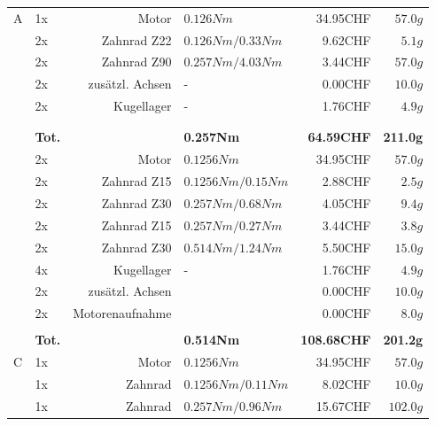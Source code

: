 \begin{figure}[h!]
\begin{tabular}{p{0.5cm}p{0.8cm}rp{3cm}rr}
    \multirow{9}[2]{*}{A}
          & 1x    & Motor           & $0.126 Nm$           & 34.95CHF & $57.0 g$ \\
          & 2x    & Zahnrad Z22     & $0.126 Nm / 0.33 Nm$ &  9.62CHF & $5.1 g$  \\
          & 2x    & Zahnrad Z90     & $0.257 Nm / 4.03 Nm$ &  3.44CHF & $57.0 g$ \\
          & 2x    & zusätzl. Achsen & -                    &  0.00CHF & $10.0 g$ \\
          & 2x    & Kugellager      & -                    &  1.76CHF & $4.9 g$  \\
          &       &                 &                      &          &  \\
          &       &                 &                      &          &  \\
          & \textbf{Tot.} &  & \textbf{0.257Nm} & \textbf{64.59CHF} & \textbf{211.0g} \\
    \multirow{10}[2]{*}{B} 
          & 2x    & Motor           & $0.1256 Nm$          & 34.95CHF & $57.0 g$ \\
          & 2x    & Zahnrad Z15     & $0.1256 Nm / 0.15 Nm$& 2.88CHF  & $2.5 g$  \\
          & 2x    & Zahnrad Z30     & $0.257 Nm / 0.68 Nm$ & 4.05CHF  & $9.4 g$  \\
          & 2x    & Zahnrad Z15     & $0.257 Nm / 0.27 Nm$ & 3.44CHF  & $3.8 g$  \\
          & 2x    & Zahnrad Z30     & $0.514 Nm / 1.24 Nm$ & 5.50CHF  & $15.0 g$ \\
          & 4x    & Kugellager      & -                    & 1.76CHF  & $4.9 g$  \\
          & 2x    & zusätzl. Achsen &                      & 0.00CHF  & $10.0 g$ \\
          & 2x    & Motorenaufnahme &                      & 0.00CHF  & $8.0 g$  \\
          &       &                 &                      &          &  \\
          & \textbf{Tot.} &       & \textbf{0.514Nm} & \textbf{108.68CHF} & \textbf{201.2g} \\
    \multirow{9}[2]{*}{C} 
          & 1x    & Motor           & $0.1256 Nm$          & 34.95CHF & $57.0 g$ \\
          & 1x    & Zahnrad         & $0.1256 Nm / 0.11 Nm$& 8.02CHF  & $10.0 g$ \\
          & 1x    & Zahnrad         & $0.257 Nm / 0.96 Nm$ & 15.67CHF & $102.0 g$ \\

\end{tabular}
\end{figure}
